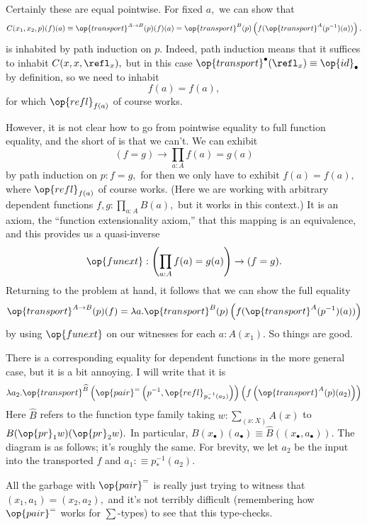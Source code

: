 Certainly these are equal pointwise. For fixed $a,$ we can show that
\[C(x_1,x_2,p)(f)(a)\equiv\op{transport}^{A\to B}(p)(f)(a)=\op{transport}^B(p)\left(f(\op{transport}^A(p^{-1})(a))\right).\]
is inhabited by path induction on $p.$ Indeed, path induction means that it suffices to inhabit $C(x,x,\refl_x),$ but in this case $\op{transport}^\bullet(\refl_x)\equiv\op{id}_\bullet$ by definition, so we need to inhabit
\[f(a)=f(a),\]
for which $\op{refl}_{f(a)}$ of course works.

However, it is not clear how to go from pointwise equality to full function equality, and the short of is that we can't. We can exhibit
\[(f=g)\to\prod_{a:A}f(a)=g(a)\]
by path induction on $p:f=g,$ for then we only have to exhibit $f(a)=f(a),$ where $\op{refl}_{f(a)}$ of course works. (Here we are working with arbitrary dependent functions $f,g:\prod_{a:A}B(a),$ but it works in this context.) It is an axiom, the ``function extensionality axiom,'' that this mapping is an equivalence, and this provides us a quasi-inverse
\[\op{funext}:\left(\prod_{a:A}f(a)=g(a)\right)\to(f=g).\]
Returning to the problem at hand, it follows that we can show the full equality
\[\op{transport}^{A\to B}(p)(f)=\lambda a.\op{transport}^B(p)\left(f(\op{transport}^A(p^{-1})(a))\right)\]
by using $\op{funext}$ on our witnesses for each $a:A(x_1).$ So things are good.

There is a corresponding equality for dependent functions in the more general case, but it is a bit annoying. I will write that it is
\[\lambda a_2.\op{transport}^{\widehat B}\left(\op{pair}^=\left(p^{-1},\op{refl}_{p_*^{-1}(a_2)}\right)\right)\left(f\left(\op{transport}^A(p)(a_2)\right)\right)\]
Here $\widehat B$ refers to the function type family taking $w:\sum_{(x:X)}A(x)$ to $B(\op{pr}_1w)(\op{pr}_2w).$ In particular, $B(x_\bullet)(a_\bullet)\equiv\widehat B((x_\bullet,a_\bullet)).$ The diagram is as follows; it's roughly the same. For brevity, we let $a_2$ be the input into the transported $f$ and $a_1:\equiv p^{-1}_*(a_2).$
\begin{center}
\end{center}
All the garbage with $\op{pair}^=$ is really just trying to witness that $(x_1,a_1)=(x_2,a_2),$ and it's not terribly difficult (remembering how $\op{pair}^=$ works for $\sum$-types) to see that this type-checks.

